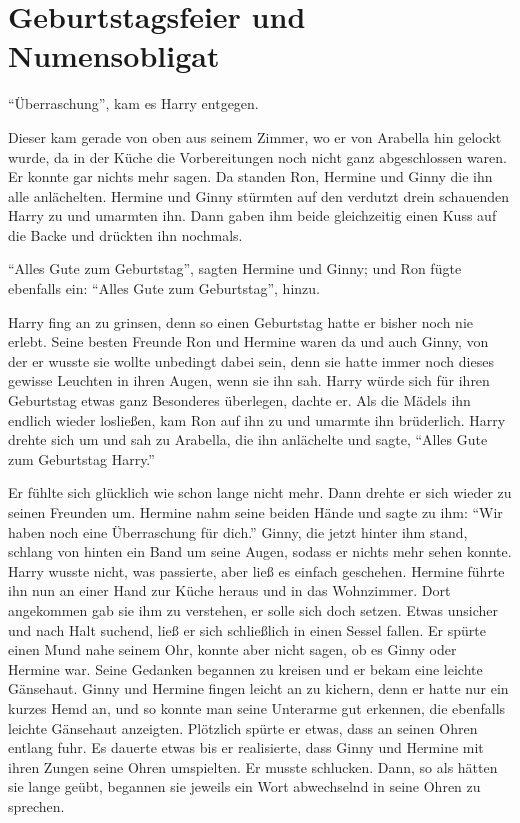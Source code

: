 \chapter{Geburtstagsfeier und Numensobligat}


\enquote{Überraschung}, kam es Harry entgegen.

Dieser kam gerade von oben aus seinem Zimmer, wo er von Arabella hin gelockt wurde, da in der Küche die Vorbereitungen noch nicht ganz abgeschlossen waren. Er konnte gar nichts mehr sagen. Da standen Ron, Hermine und Ginny die ihn alle anlächelten. Hermine und Ginny stürmten auf den verdutzt drein schauenden Harry zu und umarmten ihn. Dann gaben ihm beide gleichzeitig einen Kuss auf die Backe und drückten ihn nochmals.

\enquote{Alles Gute zum Geburtstag}, sagten Hermine und Ginny; und Ron fügte ebenfalls ein: \enquote{Alles Gute zum Geburtstag}, hinzu.

Harry fing an zu grinsen, denn so einen Geburtstag hatte er bisher noch nie erlebt. Seine besten Freunde Ron und Hermine waren da und auch Ginny, von der er wusste sie wollte unbedingt dabei sein, denn sie hatte immer noch dieses gewisse Leuchten in ihren Augen, wenn sie ihn sah. Harry würde sich für ihren Geburtstag etwas ganz Besonderes überlegen, dachte er. Als die Mädels ihn endlich wieder losließen, kam Ron auf ihn zu und umarmte ihn brüderlich. Harry drehte sich um und sah zu Arabella, die ihn anlächelte und sagte, \enquote{Alles Gute zum Geburtstag Harry.}

Er fühlte sich glücklich wie schon lange nicht mehr. Dann drehte er sich wieder zu seinen Freunden um. Hermine nahm seine beiden Hände und sagte zu ihm: \enquote{Wir haben noch eine Überraschung für dich.} Ginny, die jetzt hinter ihm stand, schlang von hinten ein Band um seine Augen, sodass er nichts mehr sehen konnte. Harry wusste nicht, was passierte, aber ließ es einfach geschehen. Hermine führte ihn nun an einer Hand zur Küche heraus und in das Wohnzimmer. Dort angekommen gab sie ihm zu verstehen, er solle sich doch setzen. Etwas unsicher und nach Halt suchend, ließ er sich schließlich in einen Sessel fallen. Er spürte einen Mund nahe seinem Ohr, konnte aber nicht sagen, ob es Ginny oder Hermine war. Seine Gedanken begannen zu kreisen und er bekam eine leichte Gänsehaut. Ginny und Hermine fingen leicht an zu kichern, denn er hatte nur ein kurzes Hemd an, und so konnte man seine Unterarme gut erkennen, die ebenfalls leichte Gänsehaut anzeigten. Plötzlich spürte er etwas, dass an seinen Ohren entlang fuhr. Es dauerte etwas bis er realisierte, dass Ginny und Hermine mit ihren Zungen seine Ohren umspielten. Er musste schlucken. Dann, so als hätten sie lange geübt, begannen sie jeweils ein Wort abwechselnd in seine Ohren zu sprechen.

